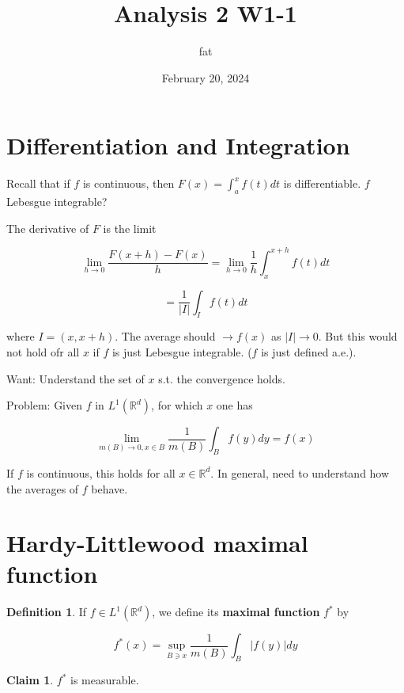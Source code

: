 \documentclass{article}
\title{Analysis 2 W1-1}
\author{fat}
\date{February 20, 2024}
\theoremstyle{definition}
\newtheorem{dfn}{Definition}
\newtheorem*{clm}{Claim}
\begin{document}
\maketitle
\thispagestyle{fancy}
\renewcommand{\footrulewidth}{0.4pt}
\cfoot{\thepage}
\renewcommand{\headrulewidth}{0.4pt}

\section{Differentiation and Integration}

\par Recall that if $f$ is continuous, then $F(x)=\int_a^x f(t)dt$ is differentiable. $f$ Lebesgue integrable?

\par The derivative of $F$ is the limit

\begin{equation}
  \lim_{h \to 0} \frac{F(x+h) - F(x)}{h} = \lim_{h \to 0} \frac{1}{h} \int_{x}^{x+h} f(t) dt
  \label{eq:}
\end{equation}

\begin{equation}
  =\frac{1}{|I|} \int_{I} f(t)dt
\end{equation}

\par where $I=(x, x+h)$. The average should $\to f(x)$ as $|I| \to 0$. But this would not hold ofr all $x$ if $f$ is just Lebesgue integrable. ($f$ is just defined a.e.).

\par Want: Understand the set of $x$ s.t. the convergence holds. 

\par Problem: Given $f$ in $L^1 (\mathbb{R}^d)$, for which $x$ one has 

$$ \lim_{m(B) \to 0, x \in B} \frac{1}{m(B)} \int_B f(y) dy = f(x)$$

\par If $f$ is continuous, this holds for all $x \in \mathbb{R}^d$. In general, need to understand how the averages of $f$ behave. 

\section{Hardy-Littlewood maximal function}

\begin{dfn}
	If $f \in L^1(\mathbb{R}^d)$, we define its \textbf{maximal function} $f^*$ by 

  \begin{equation}
    f^*(x) = \sup_{B \ni x} \frac{1}{m(B)} \int_B |f(y)| dy
    \label{eq:}
  \end{equation}
\end{dfn}
\begin{clm} 
    $f^*$ is measurable. 
\end{clm}
\end{document}
